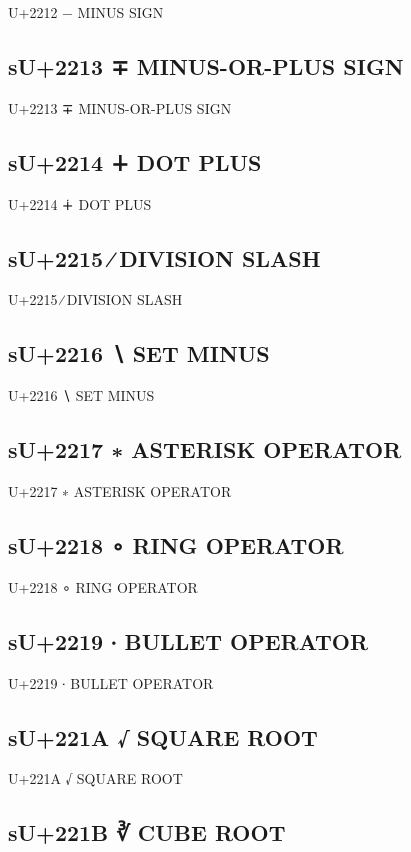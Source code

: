 U+2212 − MINUS SIGN

\subsection{sU+2213 ∓ MINUS-OR-PLUS SIGN}

U+2213 ∓ MINUS-OR-PLUS SIGN

\subsection{sU+2214 ∔ DOT PLUS}

U+2214 ∔ DOT PLUS

\subsection{sU+2215 ∕ DIVISION SLASH}

U+2215 ∕ DIVISION SLASH

\subsection{sU+2216 ∖ SET MINUS}

U+2216 ∖ SET MINUS

\subsection{sU+2217 ∗ ASTERISK OPERATOR}

U+2217 ∗ ASTERISK OPERATOR

\subsection{sU+2218 ∘ RING OPERATOR}

U+2218 ∘ RING OPERATOR

\subsection{sU+2219 ∙ BULLET OPERATOR}

U+2219 ∙ BULLET OPERATOR

\subsection{sU+221A √ SQUARE ROOT}

U+221A √ SQUARE ROOT

\subsection{sU+221B ∛ CUBE ROOT}


